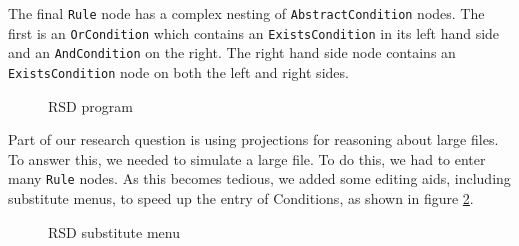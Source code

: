 The final \texttt{Rule} node has a complex nesting of \texttt{AbstractCondition} nodes.
The first is an \texttt{OrCondition} which contains an \texttt{ExistsCondition} in its left hand side and an \texttt{AndCondition} on the right.
The right hand side node contains an \texttt{ExistsCondition} node on both the left and right sides. 

\begin{figure}[h]
    \centering
    \caption{RSD program}
    \label{fig:RSDProgram}
\end{figure}

\newpage

Part of our research question is using projections for reasoning about large files.
To answer this, we needed to simulate a large file.
To do this, we had to enter many \texttt{Rule} nodes.
As this becomes tedious, we added some editing aids, including substitute menus, to speed up the entry of Conditions, as shown in figure \ref{fig:RSDSubstituteMenu}.

\begin{figure}[h]
    \centering
    \caption{RSD substitute menu}
    \label{fig:RSDSubstituteMenu}
\end{figure}

